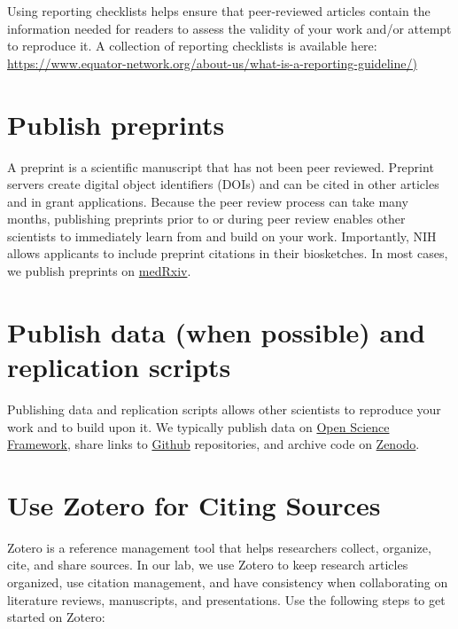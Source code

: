 \documentclass[
]{book}
\begin{document}
Using reporting checklists helps ensure that peer-reviewed articles contain the information needed for readers to assess the validity of your work and/or attempt to reproduce it. A collection of reporting checklists is available here: \href{https://www.equator-network.org/about-us/what-is-a-reporting-guideline/}{https://www.equator-network.org/about-us/what-is-a-reporting-guideline/)}

\section{Publish preprints}\label{publish-preprints}

A preprint is a scientific manuscript that has not been peer reviewed. Preprint servers create digital object identifiers (DOIs) and can be cited in other articles and in grant applications. Because the peer review process can take many months, publishing preprints prior to or during peer review enables other scientists to immediately learn from and build on your work. Importantly, NIH allows applicants to include preprint citations in their biosketches. In most cases, we publish preprints on \href{https://www.medrxiv.org/}{medRxiv}.

\section{Publish data (when possible) and replication scripts}\label{publish-data-when-possible-and-replication-scripts}

Publishing data and replication scripts allows other scientists to reproduce your work and to build upon it. We typically publish data on \href{osf.io}{Open Science Framework}, share links to \href{github.com}{Github} repositories, and archive code on \href{zenodo.org}{Zenodo}.

\section{Use Zotero for Citing Sources}\label{use-zotero-for-citing-sources}

Zotero is a reference management tool that helps researchers collect, organize, cite, and share sources. In our lab, we use Zotero to keep research articles organized, use citation management, and have consistency when collaborating on literature reviews, manuscripts, and presentations. Use the following steps to get started on Zotero:
\end{document}
